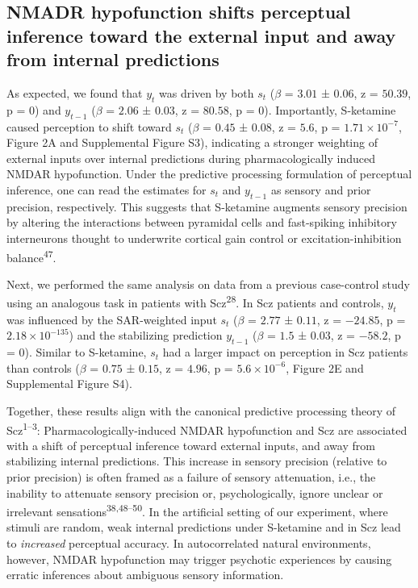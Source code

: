 \documentclass[
]{article}
\begin{document}
\subsection{NMADR hypofunction shifts perceptual inference toward the
external input and away from internal
predictions}\label{nmadr-hypofunction-shifts-perceptual-inference-toward-the-external-input-and-away-from-internal-predictions}

As expected, we found that \(y_t\) was driven by both \(s_t\) (\(\beta\)
= \(3.01\) ± \(0.06\), z = \(50.39\), p = \(0\)) and \(y_{t-1}\)
(\(\beta\) = \(2.06\) ± \(0.03\), z = \(80.58\), p = \(0\)).
Importantly, S-ketamine caused perception to shift toward \(s_t\)
(\(\beta\) = \(0.45\) ± \(0.08\), z = \(5.6\), p =
\(\ensuremath{1.71\times 10^{-7}}\), Figure 2A and Supplemental Figure
S3), indicating a stronger weighting of external inputs over internal
predictions during pharmacologically induced NMDAR hypofunction. Under
the predictive processing formulation of perceptual inference, one can
read the estimates for \(s_t\) and \(y_{t-1}\) as sensory and prior
precision, respectively. This suggests that S-ketamine augments sensory
precision by altering the interactions between pyramidal cells and
fast-spiking inhibitory interneurons thought to underwrite cortical gain
control or excitation-inhibition balance\textsuperscript{47}.

Next, we performed the same analysis on data from a previous
case-control study using an analogous task in patients with
Scz\textsuperscript{28}. In Scz patients and controls, \(y_t\) was
influenced by the SAR-weighted input \(s_t\) (\(\beta\) = \(2.77\) ±
\(0.11\), z = \(-24.85\), p = \(\ensuremath{2.18\times 10^{-135}}\)) and
the stabilizing prediction \(y_{t-1}\) (\(\beta\) = \(1.5\) ± \(0.03\),
z = \(-58.2\), p = \(0\)). Similar to S-ketamine, \(s_t\) had a larger
impact on perception in Scz patients than controls (\(\beta\) = \(0.75\)
± \(0.15\), z = \(4.96\), p = \(\ensuremath{5.6\times 10^{-6}}\), Figure
2E and Supplemental Figure S4).

Together, these results align with the canonical predictive processing
theory of Scz\textsuperscript{1--3}: Pharmacologically-induced NMDAR
hypofunction and Scz are associated with a shift of perceptual inference
toward external inputs, and away from stabilizing internal predictions.
This increase in sensory precision (relative to prior precision) is
often framed as a failure of sensory attenuation, i.e., the inability to
attenuate sensory precision or, psychologically, ignore unclear or
irrelevant sensations\textsuperscript{38,48--50}. In the artificial
setting of our experiment, where stimuli are random, weak internal
predictions under S-ketamine and in Scz lead to \emph{increased}
perceptual accuracy. In autocorrelated natural environments, however,
NMDAR hypofunction may trigger psychotic experiences by causing erratic
inferences about ambiguous sensory information.
\end{document}
